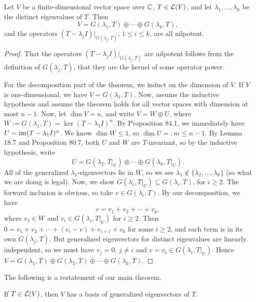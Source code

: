 \documentclass{article}
\begin{document}
\begin{theorem}
Let $V$ be a finite-dimensional vector space over $\mathbb C$, $T\in\mathcal L(V)$, and let $\lambda_1, \ldots, \lambda_k$ be the distinct eigenvalues of $T$. Then
$$V = G(\lambda_1, T) \oplus\cdots \oplus G(\lambda_k, T),$$
and the operators $(T-\lambda_jI)|_{G(\lambda_j, T)}$, $1\leq i\leq k$, are all nilpotent.
\end{theorem}
\begin{proof}
That the operators $(T-\lambda_jI)|_{G(\lambda_j, T)}$ are nilpotent follows from the definition of $G(\lambda_j, T)$, that they are the kernel of some operator power. \newpage

For the decomposition part of the theorem, we induct on the dimension of $V$. If $V$ is one-dimensional, we have $V = G(\lambda_1, T)$. Now, assume the inductive hypothesis and assume the theorem holds for all vector spaces with dimension at most $n-1$. Now, let $\dim V = n$, and write $V = W\oplus U$, where $W := G(\lambda_1, T) = \ker(T - \lambda_1 I)^n$. By Proposition 84.1, we immediately have $U = \operatorname{im}(T-\lambda_1 I)^n$. We know $\dim W \leq 1$, so $\dim U =: m \leq n-1$. By Lemma 18.7 and Proposition 80.7, both $U$ and $W$ are $T$-invariant, so by the inductive hypothesis, write
$$U = G(\lambda_2, T|_U) \oplus \cdots \oplus G(\lambda_k, T|_U).$$
All of the generalized $\lambda_1$-eigenvectors lie in $W$, so we see $\lambda_1 \not\in \{\lambda_2, \ldots, \lambda_k\}$ (so what we are doing is legal). Now, we show $G(\lambda_i, T|_U) \subseteq G(\lambda_i, T)$, for $i\geq 2$. The forward inclusion is obvious, so take $v\in G(\lambda_i, T)$. By our decomposition, we have
$$v = v_1 + v_2 + \cdots + v_k,$$
where $v_1\in W$ and $v_i\in G(\lambda_i, T|_U)$ for $i\geq 2$. Then $0 = v_1 + v_2 + \cdots + (v_i - v) + v_{i+1} + v_k$ for some $i\geq 2$, and each term is in its own $G(\lambda_j, T)$. But generalized eigenvectors for distinct eigenvalues are linearly independent, so we must have $v_j = 0$, $j\neq i$ and $v = v_i \in G(\lambda_i, T|_U)$. Hence $V = G(\lambda_1, T) \oplus G(\lambda_2, T) \oplus \cdots \oplus G(\lambda_k, T)$.
\end{proof}

The following is a restatement of our main theorem.
\begin{corollary}
If $T\in\mathcal L(V)$, then $V$ has a basis of generalized eigenvectors of $T$.
\end{corollary}
\end{document}
